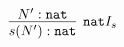 \documentclass[crop]{standalone} %
\begin{document}
$\displaystyle
\infer[\texttt{nat} I_s]{
 s(N') : \texttt{nat}
}{
 N' : \texttt{nat}
}
$
\end{document}

